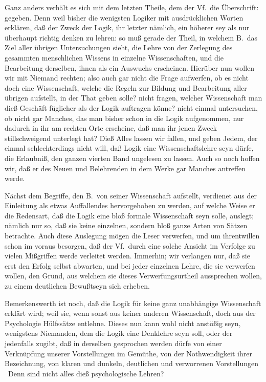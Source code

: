 Ganz anders verhält es sich mit dem letzten Theile, dem der Vf.\ die Überschrift:  gegeben. Denn weil bisher die wenigsten Logiker mit ausdrücklichen Worten erklären, daß der Zweck der Logik, ihr letzter nämlich, ein höherer sey als nur überhaupt richtig denken zu lehren: so muß gerade der Theil, in welchem B.\ das Ziel aller übrigen Untersuchungen sieht, die Lehre von der Zerlegung des gesammten menschlichen Wissens in einzelne Wissenschaften, und die Bearbeitung derselben, ihnen als ein Auswuchs erscheinen. Hierüber nun wollen wir mit Niemand rechten; also auch gar nicht die Frage aufwerfen, ob es nicht doch eine Wissenschaft, welche die Regeln zur Bildung und Bearbeitung aller übrigen aufstellt, in der That geben solle? nicht fragen, welcher Wissenschaft man dieß Geschäft füglicher als der Logik auftragen könne? nicht einmal untersuchen, ob nicht gar Manches, das man bisher schon in die Logik aufgenommen, nur dadurch in ihr am rechten Orte erscheine, daß man ihr jenen Zweck stillschweigend unterlegt hat? Dieß Alles lassen wir fallen, und geben Jedem, der einmal schlechterdings nicht will, daß Logik eine Wissenschaftslehre seyn dürfe, die Erlaubniß, den ganzen vierten Band ungelesen zu lassen. Auch so noch hoffen wir, daß er des Neuen und Belehrenden in dem Werke gar Manches antreffen werde. \par
Nächst dem Begriffe, den B.\ von seiner Wissenschaft aufstellt, verdienet aus der Einleitung als etwas Auffallendes hervorgehoben zu werden, auf welche Weise er  die Redensart, daß die Logik eine bloß formale Wissenschaft seyn solle, auslegt; nämlich nur so, daß sie keine einzelnen, sondern bloß ganze Arten von Sätzen betrachte. Auch diese Auslegung mögen die Leser verwerfen, und um ihrentwillen schon im voraus besorgen, daß der Vf.\ durch eine solche Ansicht im Verfolge zu vielen Mißgriffen werde verleitet werden. Immerhin; wir verlangen nur, daß sie erst den Erfolg selbst abwarten, und bei jeder einzelnen Lehre, die sie verwerfen wollen, den Grund, aus welchem sie dieses Verwerfungsurtheil aussprechen wollen, zu einem deutlichen Bewußtseyn sich erheben. \par
Bemerkenswerth ist noch, daß  die Logik für keine ganz unabhängige Wissenschaft erklärt wird; weil sie, wenn sonst aus keiner anderen Wissenschaft, doch aus der Psychologie Hülfssätze entlehne. Dieses nun kann wohl nicht anstößig seyn, wenigstens Niemanden, dem die Logik eine Denklehre seyn soll, oder der jedenfalls zugibt, daß in derselben gesprochen werden dürfe von einer Verknüpfung unserer Vorstellungen im Gemüthe, von der Nothwendigkeit ihrer Bezeichnung, von klaren und dunkeln, deutlichen und verworrenen Vorstellungen \udgl\ Denn sind nicht alles dieß psychologische Lehren? \par

